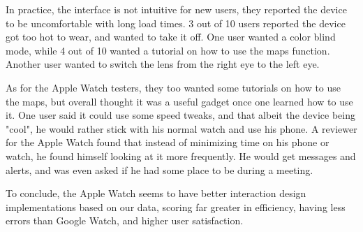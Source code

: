 \documentclass[paper=a4, fontsize=11pt]{scrartcl}	%
\numberwithin{equation}{section}															%
\numberwithin{figure}{section}																%
\numberwithin{table}{section}																%
\begin{document}
\par In practice, the interface is not intuitive for new users, they reported the device to be uncomfortable with long load times. 3 out of 10 users reported the device got too hot to wear, and wanted to take it off. One user wanted a color blind mode, while 4 out of 10 wanted a tutorial on how to use the maps function. Another user wanted to switch the lens from the right eye to the left eye. \par
 As for the Apple Watch testers, they too wanted some tutorials on how to use the maps, but overall thought it was a useful gadget once one learned how to use it. One user said it could use some speed tweaks, and that albeit the device being "cool", he would rather stick with his normal watch and use his phone. A reviewer for the Apple Watch found that instead of minimizing time on his phone or watch, he found himself looking at it more frequently. He would get messages and alerts, and was even asked if he had some place to be during a meeting. \par
 
 To conclude, the Apple Watch seems to have better interaction design implementations based on our data, scoring far greater in efficiency, having less errors than Google Watch, and higher user satisfaction. 


\newpage
\end{document}
